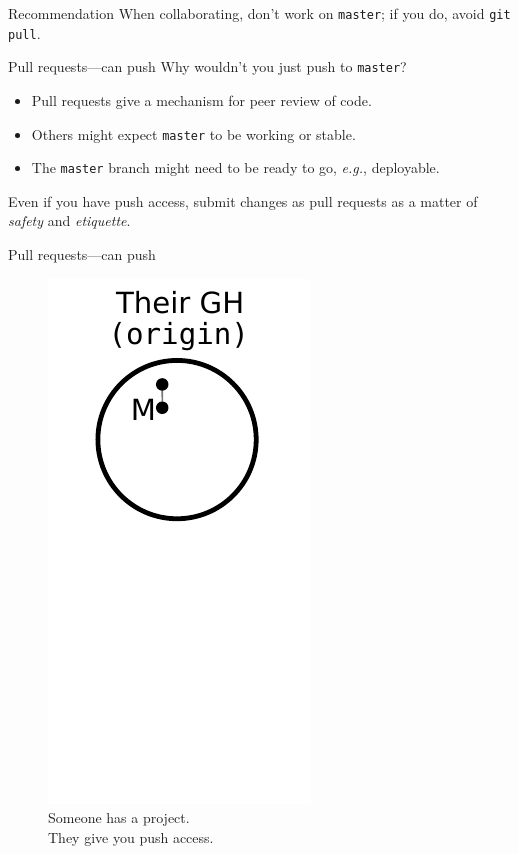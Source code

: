 \begin{frame}{Recommendation}
  \huge {
  When collaborating, don't work on \texttt{master}; if you do,
  avoid \texttt{git pull}.
}
\end{frame}

\begin{frame}{Pull requests---can push}
  Why wouldn't you just push to \texttt{master}?

  \begin{itemize}
    \item Pull requests give a mechanism for peer review of code.
    \item Others might expect \texttt{master} to be working or stable.
    \item The \texttt{master} branch might need to be ready to
          go, \emph{e.g.}, deployable.
  \end{itemize}

  Even if you have push access, submit changes as pull requests as a
  matter of \emph{safety} and \emph{etiquette}.
\end{frame}

\begin{frame}{Pull requests---can push}
  \begin{figure}
    \includegraphics{push_001.pdf}
    \\ Someone has a project.
    \\ They give you push access.
  \end{figure}
\end{frame}

